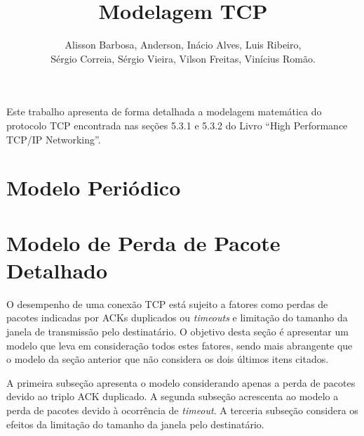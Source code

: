 \documentclass[12pt]{article}
\title{Modelagem TCP}
\author{Alisson Barbosa, Anderson, Inácio Alves, Luis Ribeiro,\\
 Sérgio Correia, Sérgio Vieira, Vilson Freitas, Vinícius Romão.}
\begin{document}
 

\maketitle

     
\begin{resumo} 
  Este trabalho apresenta de forma detalhada a modelagem matemática do protocolo
  TCP encontrada nas seções 5.3.1 e 5.3.2 do Livro ``High Performance TCP/IP Networking''.
\end{resumo}


\section{Modelo Periódico}



\section{Modelo de Perda de Pacote Detalhado}
O desempenho de uma conexão TCP está sujeito a fatores como perdas de pacotes indicadas por 
ACKs duplicados ou \textit{timeouts} e limitação do tamanho da janela de transmissão pelo 
destinatário. O objetivo desta seção é apresentar um modelo que leva em consideração todos 
estes fatores, sendo mais abrangente que o modelo da seção anterior que não considera os dois
últimos itens citados.

A primeira subseção apresenta o modelo considerando apenas a perda de pacotes devido ao 
triplo ACK duplicado. A segunda subseção acrescenta ao modelo a perda de pacotes devido à
ocorrência de \textit{timeout}. A terceria subseção considera os efeitos da limitação do 
tamanho da janela pelo destinatário.



\end{document}

